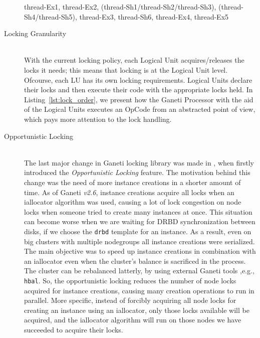 \begin{description}
    thread-Ex1, thread-Ex2, (thread-Sh1/thread-Sh2/thread-Sh3),
    (thread-Sh4/thread-Sh5), thread-Ex3, thread-Sh6, thread-Ex4, thread-Ex5


  \item[Locking Granularity] \hfill \\
    With the current locking policy, each Logical Unit acquires/releases the
    locks it needs; this means that locking is at the Logical Unit level.
    Ofcourse, each LU has its own locking requirements. Logical Units declare
    their locks and then execute their code with the appropriate locks held. In
    Listing~\ref{lst:lock_order}, we present how the Ganeti Processor with the
    aid of the Logical Units executes an OpCode from an abstracted point of
    view, which pays more attention to the lock handling.
  \item[Opportunistic Locking] \hfill \\
    The last major change in Ganeti locking library was made in ,
    when firstly introduced the \emph{Opportunistic Locking} feature. The
    motivation behind this change was the need of more instance creations in a
    shorter amount of time. As of Ganeti \emph{v2.6}, instance creations acquire
    all locks when an iallocator algorithm was used, causing a lot of lock
    congestion on node locks when someone tried to create many instances at
    once. This situation can become worse when we are waiting for DRBD
    synchronization between disks, if we choose the \texttt{drbd} template for
    an instance. As a result, even on big clusters with multiple nodegroups all
    instance creations were serialized. The main objective was to speed up
    instance creations in combination with an iallocator even when the cluster's
    balance is sacrificed in the process. The cluster can be rebalanced latterly,
    by using external Ganeti tools ,e.g., \texttt{hbal}. So, the opportunistic
    locking reduces the number of node locks acquired for instance creations,
    causing many creation operations to run in parallel. More specific, instead
    of forcibly acquiring all node locks for creating an instance using an
    iallocator, only those locks available will be acquired, and the iallocator
    algorithm will run on those nodes we have succeeded to acquire their locks.
\end{description}

